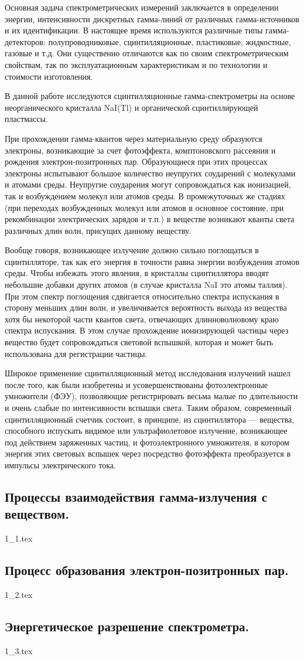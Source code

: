 Основная задача спектрометрических измерений заключается в определении энергии,
интенсивности дискретных гамма-линий от различных гамма-источников и их
идентификации. В настоящее время используются различные типы гамма-детекторов:
полупроводниковые, сцинтилляционные, пластиковые, жидкостные, газовые и т.д. Они
существенно отличаются как по своим спектрометрическим свойствам, так по
эксплуатационным характеристикам и по технологии и стоимости изготовления.

В данной работе исследуются сцинтилляционные гамма-спектрометры на основе
неорганического кристалла NaI(Tl) и органической сцинтиллирующей пластмассы.

При прохождении гамма-квантов через материальную среду образуются электроны,
возникающие за счет фотоэффекта, комптоновского рассеяния и рождения
электрон-позитронных пар. Образующиеся при этих процессах электроны испытывают
большое количество неупругих соударений с молекулами и атомами среды. Неупругие
соударения могут сопровождаться как ионизацией, так и возбуждением молекул или
атомов среды. В промежуточных же стадиях (при переходах возбужденных молекул или
атомов в основное состояние, при рекомбинации электрических зарядов и т.п.) в
веществе возникают кванты света различных длин волн, присущих данному веществу.

Вообще говоря, возникающее излучение должно сильно поглощаться в сцинтилляторе,
так как его энергия в точности равна энергии возбуждения атомов среды. Чтобы
избежать этого явления, в кристаллы сцинтиллятора вводят небольшие добавки
других атомов (в случае кристалла NaI это атомы таллия). При этом спектр
поглощения сдвигается относительно спектра испускания в сторону меньших длин
волн, и увеличивается вероятность выхода из вещества хотя бы некоторой части
квантов света, отвечающих длинноволновому краю спектра испускания. В этом случае
прохождение ионизирующей частицы через вещество будет сопровождаться световой
вспышкой, которая и может быть использована для регистрации частицы.

Широкое применение сцинтилляционный метод исследования излучений нашел после
того, как были изобретены и усовершенствованы фотоэлектронные умножители (ФЭУ),
позволяющие регистрировать весьма малые по длительности и очень слабые по
интенсивности вспышки света. Таким образом, современный сцинтилляционный счетчик
состоит, в принципе, из сцинтиллятора — вещества, способного испускать видимое
или ультрафиолетовое излучение, возникающее под действием заряженных частиц, и
фотоэлектронного умножителя, в котором энергия этих световых вспышек через
посредство фотоэффекта преобразуется в импульсы электрического тока.

\subsection{Процессы взаимодействия гамма-излучения с веществом.}
{1_1.tex}

\subsection{Процесс образования электрон-позитронных пар.}
{1_2.tex}

\subsection{Энергетическое разрешение спектрометра.}
{1_3.tex}